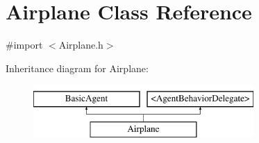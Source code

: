 \hypertarget{interface_airplane}{
\section{\-Airplane \-Class \-Reference}
\label{interface_airplane}
}


{\ttfamily \#import $<$\-Airplane.\-h$>$}

\-Inheritance diagram for \-Airplane\-:\begin{figure}[H]
\begin{center}
\leavevmode
\includegraphics[height=2.000000cm]{interface_airplane}
\end{center}
\end{figure}
